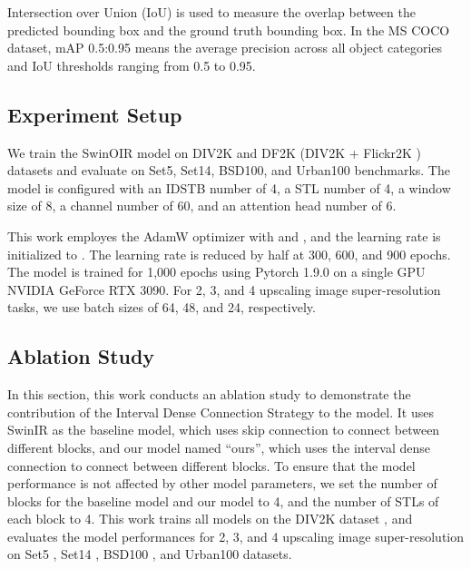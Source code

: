 \documentclass[default,iicol]{sn-jnl}
\theoremstyle{thmstyleone}\newtheorem{theorem}{Theorem}\newtheorem{proposition}[theorem]{Proposition}
\theoremstyle{thmstyletwo}\newtheorem{example}{Example}\newtheorem{remark}{Remark}\theoremstyle{thmstylethree}\newtheorem{definition}{Definition}
\begin{document}
Intersection over Union (IoU) is used to measure the overlap between the predicted bounding box and the ground truth bounding box. In the MS COCO dataset, mAP 0.5:0.95 means the average precision across all object categories and IoU thresholds ranging from 0.5 to 0.95.

\subsection{Experiment Setup}
\label{setup}
We train the SwinOIR model on DIV2K \cite{Ignatov2018} and DF2K (DIV2K + Flickr2K \cite{timofte2017ntire}) datasets and evaluate on Set5, Set14, BSD100, and Urban100 benchmarks. The model is configured with an IDSTB number of 4, a STL number of 4, a window size of 8, a channel number of 60, and an attention head number of 6.

This work employes the AdamW optimizer \cite{loshchilov2018decoupled} with  and , and the learning rate is initialized to . The learning rate is reduced by half at 300, 600, and 900 epochs. The model is trained for 1,000 epochs using Pytorch 1.9.0 on a single GPU NVIDIA GeForce RTX 3090. For 2, 3, and 4 upscaling image super-resolution tasks, we use batch sizes of 64, 48, and 24, respectively.

\subsection{Ablation Study}
\label{ablation}
In this section, this work conducts an ablation study to demonstrate the contribution of the Interval Dense Connection Strategy to the model. It uses SwinIR \cite{liang2021swinir} as the baseline model, which uses skip connection to connect between different blocks, and our model named ``ours'', which uses the interval dense connection to connect between different blocks. To ensure that the model performance is not affected by other model parameters, we set the number of blocks for the baseline model and our model to 4, and the number of STLs of each block to 4. This work trains all models on the DIV2K dataset \cite{Ignatov2018}, and evaluates the model performances for 2, 3, and 4 upscaling image super-resolution on Set5 \cite{bevilacqua2012low}, Set14 \cite{zeyde2012single}, BSD100 \cite{martin2001database}, and Urban100 \cite{huang2015single} datasets.
\end{document}
